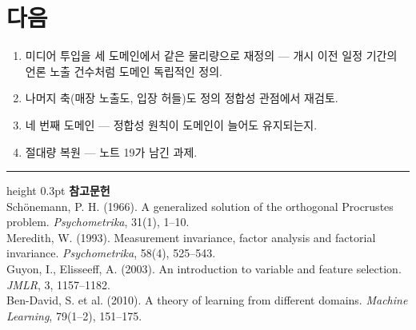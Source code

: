 \documentclass[10pt]{article}
\begin{document}
\section{다음}

\begin{enumerate}[leftmargin=1.3em,itemsep=0.15em]
\item 미디어 투입을 세 도메인에서 같은 물리량으로 재정의 --- 개시 이전 일정 기간의
      언론 노출 건수처럼 도메인 독립적인 정의.
\item 나머지 축(매장 노출도, 입장 허들)도 정의 정합성 관점에서 재검토.
\item 네 번째 도메인 --- 정합성 원칙이 도메인이 늘어도 유지되는지.
\item 절대량 복원 --- 노트 19가 남긴 과제.
\end{enumerate}

\vspace{0.6em}
\hrule height 0.3pt
\vspace{0.5em}
{\footnotesize
\textbf{참고문헌}\\[0.3em]
Schönemann, P. H. (1966). A generalized solution of the orthogonal Procrustes
problem. \emph{Psychometrika}, 31(1), 1--10.\\[0.15em]
Meredith, W. (1993). Measurement invariance, factor analysis and factorial
invariance. \emph{Psychometrika}, 58(4), 525--543.\\[0.15em]
Guyon, I., Elisseeff, A. (2003). An introduction to variable and feature selection.
\emph{JMLR}, 3, 1157--1182.\\[0.15em]
Ben-David, S. et al. (2010). A theory of learning from different domains.
\emph{Machine Learning}, 79(1--2), 151--175.
}
\end{document}
